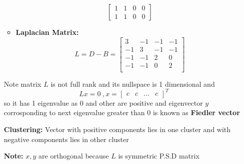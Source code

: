 \documentclass[a4paper]{article}
\numberwithin{equation}{section}
\begin{document}
\begin{itemize}
\begin{itemize}
\[\begin{bmatrix}
        1&1&0&0\\
        1&1&0&0
    \end{bmatrix}\]
    \item \textbf{Laplacian Matrix:} 
    \[L=D-B=\begin{bmatrix}
        3&-1&-1&-1\\
        -1&3&-1&-1\\
        -1&-1&2&0\\
        -1&-1&0&2\\
    \end{bmatrix}\]
\end{itemize}
Note matrix $L$ is not full rank and its nullspace is 1 dimensional and
\[Lx=0 \hspace{3pt}, x=\begin{bmatrix}
    c&c&\dots&c
\end{bmatrix}^T\]
so it has 1 eigenvalue as 0 and other are positive and eigenvector $y$ corrosponding to next eigenvalue greater than 0 is known as \textbf{Fiedler vector}

\textbf{Clustering:} Vector with positive components lies in one cluster and with negative components lies in other cluster

\textbf{Note:} $x,y$ are orthogonal because $L$ is symmetric P.S.D matrix
    \end{itemize}
\end{document}
